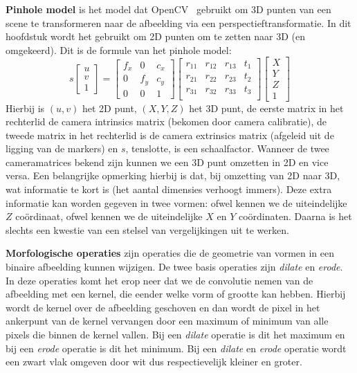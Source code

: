 \textbf{Pinhole model} is het model dat OpenCV~\cite{opencv} gebruikt om 3D punten van een scene te transformeren naar de afbeelding via een perspectieftransformatie. In dit hoofdstuk wordt het gebruikt om 2D punten om te zetten naar 3D (en omgekeerd). Dit is de formule van het pinhole model:
$$
s
\begin{bmatrix}
	u \\ 
	v \\
	1
\end{bmatrix} 
=
\begin{bmatrix}
	f_x & 0 & c_x \\ 
	0 & f_y & c_y \\
	0 & 0 & 1
\end{bmatrix} 
\begin{bmatrix}
	r_{11} & r_{12} & r_{13} & t_1 \\ 
	r_{21} & r_{22} & r_{23} & t_2 \\
	r_{31} & r_{32} & r_{33} & t_3 \\
\end{bmatrix}
\begin{bmatrix}
	X \\ 
	Y \\
	Z \\
	1
\end{bmatrix}
$$
Hierbij is $(u,v)$ het 2D punt, $(X,Y,Z)$ het 3D punt, de eerste matrix in het rechterlid de camera intrinsics matrix (bekomen door camera calibratie), de tweede matrix in het rechterlid is de camera extrinsics matrix (afgeleid uit de ligging van de markers) en $s$, tenslotte, is een schaalfactor. Wanneer de twee cameramatrices bekend zijn kunnen we een 3D punt omzetten in 2D en vice versa. Een belangrijke opmerking hierbij is dat, bij omzetting van 2D naar 3D, wat informatie te kort is (het aantal dimensies verhoogt immers). Deze extra informatie kan worden gegeven in twee vormen: ofwel kennen we de uiteindelijke $Z$ co\"ordinaat, ofwel kennen we de uiteindelijke $X$ en $Y$ co\"ordinaten. Daarna is het slechts een kwestie van een stelsel van vergelijkingen uit te werken.

\textbf{Morfologische operaties} zijn operaties die de geometrie van vormen in een binaire afbeelding kunnen wijzigen. De twee basis operaties zijn \textit{dilate} en \textit{erode}. In deze operaties komt het erop neer dat we de convolutie nemen van de afbeelding met een kernel, die eender welke vorm of grootte kan hebben. Hierbij wordt de kernel over de afbeelding geschoven en dan wordt de pixel in het ankerpunt van de kernel vervangen door een maximum of minimum van alle pixels die binnen de kernel vallen. Bij een \textit{dilate} operatie is dit het maximum en bij een \textit{erode} operatie is dit het minimum. Bij een \textit{dilate} en \textit{erode} operatie wordt een zwart vlak omgeven door wit dus respectievelijk kleiner en groter. 

